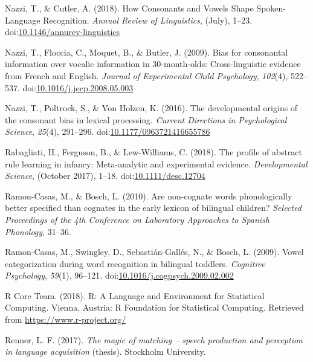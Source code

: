 \documentclass[man]{apa6}
\begin{document}
\leavevmode\hypertarget{ref-Nazzi2018}{}%
Nazzi, T., \& Cutler, A. (2018). How Consonants and Vowels Shape Spoken-Language Recognition. \emph{Annual Review of Linguistics}, (July), 1--23. doi:\href{https://doi.org/10.1146/annurev-linguistics}{10.1146/annurev-linguistics}

\leavevmode\hypertarget{ref-Nazzi2009a}{}%
Nazzi, T., Floccia, C., Moquet, B., \& Butler, J. (2009). Bias for consonantal information over vocalic information in 30-month-olds: Cross-linguistic evidence from French and English. \emph{Journal of Experimental Child Psychology}, \emph{102}(4), 522--537. doi:\href{https://doi.org/10.1016/j.jecp.2008.05.003}{10.1016/j.jecp.2008.05.003}

\leavevmode\hypertarget{ref-Nazzi2016}{}%
Nazzi, T., Poltrock, S., \& Von Holzen, K. (2016). The developmental origins of the consonant bias in lexical processing. \emph{Current Directions in Psychological Science}, \emph{25}(4), 291--296. doi:\href{https://doi.org/10.1177/0963721416655786}{10.1177/0963721416655786}

\leavevmode\hypertarget{ref-Rabagliati2018}{}%
Rabagliati, H., Ferguson, B., \& Lew-Williams, C. (2018). The profile of abstract rule learning in infancy: Meta-analytic and experimental evidence. \emph{Developmental Science}, (October 2017), 1--18. doi:\href{https://doi.org/10.1111/desc.12704}{10.1111/desc.12704}

\leavevmode\hypertarget{ref-Ramon-Casas2010}{}%
Ramon-Casas, M., \& Bosch, L. (2010). Are non-cognate words phonologically better specified than cognates in the early lexicon of bilingual children? \emph{Selected Proceedings of the 4th Conference on Laboratory Approaches to Spanish Phonology}, 31--36.

\leavevmode\hypertarget{ref-Ramon-Casas2009}{}%
Ramon-Casas, M., Swingley, D., Sebastián-Gallés, N., \& Bosch, L. (2009). Vowel categorization during word recognition in bilingual toddlers. \emph{Cognitive Psychology}, \emph{59}(1), 96--121. doi:\href{https://doi.org/10.1016/j.cogpsych.2009.02.002}{10.1016/j.cogpsych.2009.02.002}

\leavevmode\hypertarget{ref-R}{}%
R Core Team. (2018). R: A Language and Environment for Statistical Computing. Vienna, Austria: R Foundation for Statistical Computing. Retrieved from \url{https://www.r-project.org/}

\leavevmode\hypertarget{ref-Renner2017}{}%
Renner, L. F. (2017). \emph{The magic of matching -- speech production and perception in language acquisition} (thesis). Stockholm University.
\end{document}
